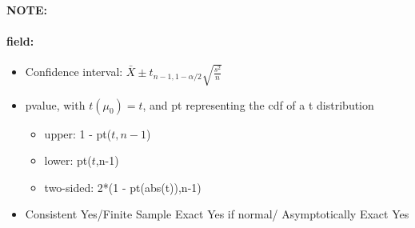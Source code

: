 \documentclass[12pt]{article}
\newenvironment{note}{\paragraph{NOTE:}}{}
\newenvironment{field}{\paragraph{field:}}{}
\begin{document}
\begin{note}
\begin{field}
\begin{itemize}
   \item Confidence interval: $\bar{X} \pm t_{n-1,1-\alpha/2}\sqrt{\frac{s^2}{n}}$
   \item pvalue, with $t(\mu_0)  = t$, and pt representing the cdf of a t distribution
         \begin{itemize}
          \item upper: 1 - pt($t,n-1$)
          \item lower: pt($t$,n-1)
          \item two-sided: 2*(1 - pt(abs(t)),n-1)
         \end{itemize}
   \item Consistent Yes/Finite Sample Exact Yes if normal/ Asymptotically Exact Yes
  \end{itemize}
 \end{field}
\end{note}
\end{document}
